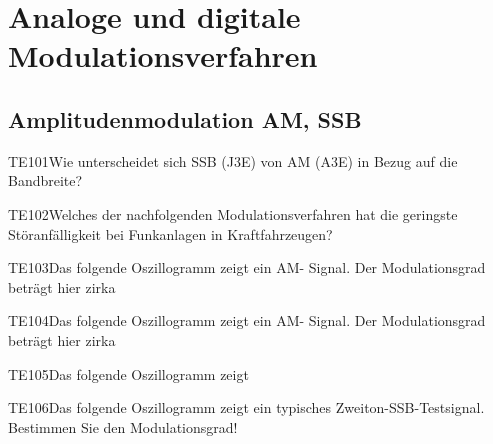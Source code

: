 \section{Analoge und digitale Modulationsverfahren}

\subsection{Amplitudenmodulation AM, SSB}

\begin{question}{TE101}{Wie unterscheidet sich SSB (J3E) von AM (A3E) in Bezug auf die Bandbreite?}
\end{question}

\begin{question}{TE102}{Welches der nachfolgenden Modulationsverfahren hat die geringste Störanfälligkeit bei Funkanlagen in Kraftfahrzeugen?}
\end{question}

\begin{question}{TE103}{Das folgende Oszillogramm zeigt ein AM- Signal. Der Modulationsgrad beträgt hier zirka}
\end{question}

\begin{question}{TE104}{Das folgende Oszillogramm zeigt ein AM- Signal. Der Modulationsgrad beträgt hier zirka}
\end{question}

\begin{question}{TE105}{Das folgende Oszillogramm zeigt}
\end{question}

\begin{question}{TE106}{Das folgende Oszillogramm zeigt ein typisches Zweiton-SSB-Testsignal. Bestimmen Sie den Modulationsgrad!}
\end{question}

